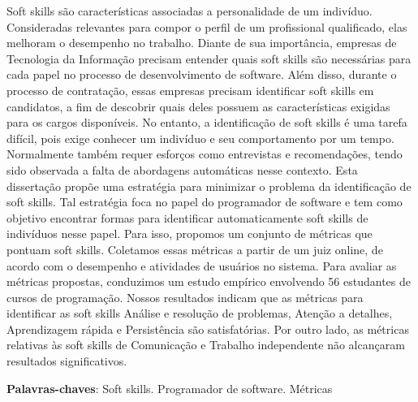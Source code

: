 \documentclass{ppgi}
\begin{document}
\begin{resumo}

Soft skills são características associadas a personalidade de um indivíduo.
Consideradas relevantes para compor o perfil de um profissional qualificado, elas melhoram o desempenho no trabalho.
Diante de sua importância, empresas de Tecnologia da Informação precisam entender quais soft skills são necessárias para cada papel no processo de desenvolvimento de software.
Além disso, durante o processo de contratação, essas empresas precisam identificar soft skills em candidatos, a fim de descobrir quais deles possuem as características exigidas para os cargos disponíveis.
No entanto, a identificação de soft skills é uma tarefa difícil, pois exige conhecer um indivíduo e seu comportamento por um tempo. 
Normalmente também requer esforços como entrevistas e recomendações, tendo sido observada a falta de abordagens automáticas nesse contexto.
Esta dissertação propõe uma estratégia para minimizar o problema da identificação de soft skills.
Tal estratégia foca no papel do programador de software e tem como objetivo encontrar formas para identificar automaticamente soft skills de indivíduos nesse papel.
Para isso, propomos um conjunto de métricas que pontuam soft skills.
Coletamos essas métricas a partir de um juiz online, de acordo com o desempenho e atividades de usuários no sistema.
Para avaliar as métricas propostas, conduzimos um estudo empírico envolvendo 56 estudantes de cursos de programação.
Nossos resultados indicam que as métricas para identificar as soft skills Análise e resolução de problemas, Atenção a detalhes, Aprendizagem rápida e Persistência são satisfatórias.
Por outro lado, as métricas relativas às soft skills de Comunicação e Trabalho independente não alcançaram resultados significativos.

\posresumo

\textbf{Palavras-chaves}: Soft skills. Programador de software. Métricas
\end{resumo}
\end{document}
